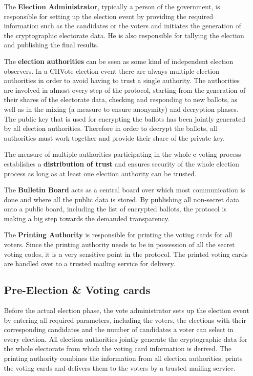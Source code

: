 The \textbf{Election Administrator}, typically a person of the government, is responsible for setting up the election event by providing the required information such as the candidates or the voters and initiates the generation of the cryptographic electorate data. He is also responsible for tallying the election and publishing the final results.

The \textbf{election authorities} can be seen as some kind of independent election observers. In a CHVote election event there are always multiple election authorities in order to avoid having to trust a single authority. The authorities are involved in almost every step of the protocol, starting from the generation of their shares of the electorate data, checking and responding to new ballots, as well as in the mixing (a measure to ensure anonymity) and decryption phases. The public key that is used for encrypting the ballots has been jointly generated by all election authorities. Therefore in order to decrypt the ballots, all authorities must work together and provide their share of the private key. 

The measure of multiple authorities participating in the whole e-voting process establishes a \textbf{distribution of trust} and ensures security of the whole election process as long as at least one election authority can be trusted.

The \textbf{Bulletin Board} acts as a central board over which most communication is done and where all the public data is stored. By publishing all non-secret data onto a public board, including the list of encrypted ballots, the protocol is making a big step towards the demanded transparency.

The \textbf{Printing Authority} is responsible for printing the voting cards for all voters. Since the printing authority needs to be in possession of all the secret voting codes, it is a very sensitive point in the protocol. The printed voting cards are handled over to a trusted mailing service for delivery.

\subsection{Pre-Election \& Voting cards}
Before the actual election phase, the vote administrator sets up the election event by entering all required parameters, including the voters, the elections with their corresponding candidates and the number of candidates a voter can select in every election. All election authorities jointly generate the cryptographic data for the whole electorate from which the voting card information is derived. The printing authority combines the information from all election authorities, prints the voting cards and delivers them to the voters by a trusted mailing service. 

